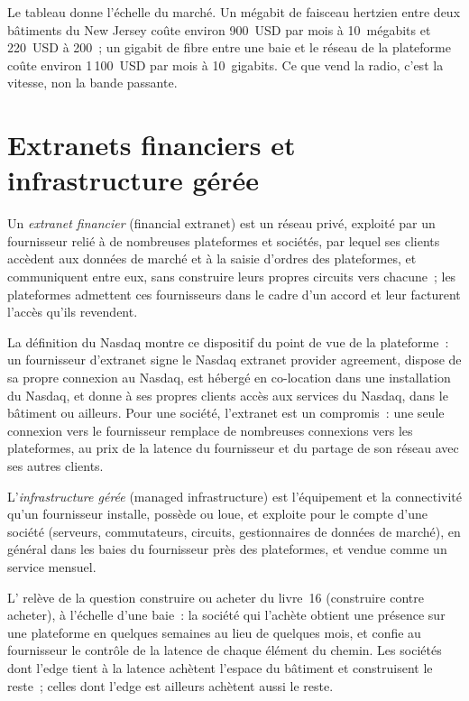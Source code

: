 Le tableau donne l'échelle du marché. Un mégabit de faisceau hertzien entre deux bâtiments du New Jersey coûte environ 900~USD par mois à 10~mégabits et
220~USD à 200~; un gigabit de fibre entre une baie et le réseau de la plateforme coûte environ 1\,100~USD par mois à 10~gigabits. Ce que vend la radio,
c'est la vitesse, non la bande passante.

\section{Extranets financiers et infrastructure gérée}

\begin{definition}\label{def:nw:buying-connectivity:extranet}
Un \emph{extranet financier} (financial extranet) est un réseau privé, exploité par un fournisseur relié à de nombreuses plateformes et sociétés, par lequel
ses clients accèdent aux données de marché et à la saisie d'ordres des plateformes, et communiquent entre eux, sans construire leurs propres circuits vers chacune~; les plateformes admettent ces fournisseurs
dans le cadre d'un accord et leur facturent l'accès qu'ils revendent.
\end{definition}

La définition du Nasdaq montre ce dispositif du point de vue de la plateforme~: un fournisseur d'extranet signe le Nasdaq extranet provider agreement, dispose de
sa propre connexion au Nasdaq, est hébergé en co-location dans une installation du Nasdaq, et donne à ses propres clients accès aux services du Nasdaq, dans le bâtiment ou ailleurs.
Pour une société, l'extranet est un compromis~: une seule connexion vers le fournisseur remplace de nombreuses connexions vers les plateformes, au prix de la latence du fournisseur et du
partage de son réseau avec ses autres clients.

\begin{definition}\label{def:nw:buying-connectivity:managed}
L'\emph{infrastructure gérée} (managed infrastructure) est l'équipement et la connectivité qu'un fournisseur installe, possède ou loue, et exploite
pour le compte d'une société (serveurs, commutateurs, circuits, gestionnaires de données de marché), en général dans les baies du fournisseur près des plateformes, et vendue comme
un service mensuel.
\end{definition}

L' relève de la question construire ou acheter du livre~16 (construire contre acheter), à l'échelle d'une baie~: la société qui l'achète obtient
une présence sur une plateforme en quelques semaines au lieu de quelques mois, et confie au fournisseur le contrôle de la latence de chaque élément du chemin. Les sociétés dont
l'edge tient à la latence achètent l'espace du bâtiment et construisent le reste~; celles dont l'edge est ailleurs achètent aussi le reste.

